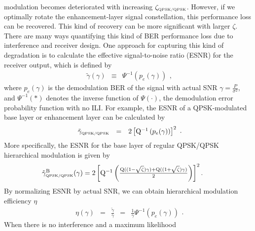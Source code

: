 \documentclass[10pt,fleqn, twocolumn]{IEEEtran}
\begin{document}
modulation becomes deteriorated with increasing
$\zeta_{\mbox{\tiny QPSK/QPSK}}$. However, if we optimally rotate
the enhancement-layer signal constellation, this performance loss
can be recovered. This kind of recovery can be more significant
with larger $\zeta$. There are many ways quantifying this kind of
BER performance loss due to interference and receiver design. One
approach for capturing this kind of degradation is to calculate
the effective signal-to-noise ratio (ESNR) for the receiver
output, which is defined by
\begin{equation}
\begin{array}{rcl}
\tilde{\gamma}\left(\gamma\right)&\equiv&\Psi^{-1}\left(p_{e}(\gamma)\right)
\end{array},\label{eff_SNR}
\end{equation}
\noindent where $p_{e}(\gamma)$ is the demodulation BER of the
signal with actual SNR $\gamma=\frac{P}{\sigma^2}$, and
$\Psi^{-1}\left(\ast\right)$ denotes the inverse function of
$\Psi\left(\cdot\right)$, the demodulation error probability
function with no ILI. For example, the ESNR of a QPSK-modulated
base layer or enhancement layer can be calculated by
\begin{equation}
\begin{array}{rcl}
\tilde{\gamma}_{\mbox{\tiny QPSK/QPSK}}&=&2\left[{\rm
Q}^{-1}\left(p_{e}(\gamma)\right)\right]^2
\end{array}.\label{eff_SNR_QPSK}
\end{equation}
\noindent More specifically, the ESNR for the base layer of
regular QPSK/QPSK hierarchical modulation is given by
\begin{equation}\hspace{-0.225in}
\begin{array}{l}
\tilde{\gamma}_{\mbox{\tiny QPSK/QPSK}}^{\rm
B}(\gamma)=2\left[{\rm Q}^{-1}\left(\frac{{\rm
Q}((1-\sqrt{\zeta})\gamma)+{\rm
Q}((1+\sqrt{\zeta})\gamma)}{2}\right)\right]^2.
\end{array}\label{eff_SNR_QPSK_QPSK}
\end{equation}
\noindent By normalizing ESNR by actual SNR, we can obtain
hierarchical modulation efficiency $\eta$
\begin{equation}
\begin{array}{rcccl}
\eta\left(\gamma\right)&=&\frac{\tilde{\gamma}}{\gamma}&=&\frac{1}{\gamma}\Psi^{-1}\left(p_{e}(\gamma)\right)
\end{array}.\label{mod_eff}
\end{equation}
\noindent When there is no interference and a maximum likelihood
\end{document}
